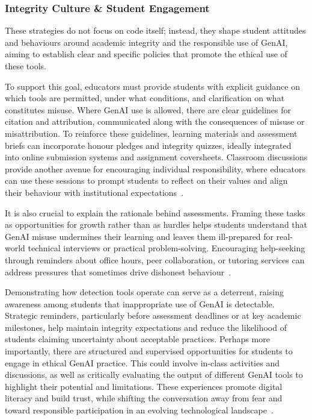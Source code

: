 \subsubsection{Integrity Culture \& Student Engagement}
\label{sec:integrity-culture-&-student-engagement}

These strategies do not focus on code itself; instead, they shape student attitudes and behaviours around academic integrity and the responsible use of GenAI, aiming to establish clear and specific policies that promote the ethical use of these tools. 

To support this goal, educators must provide students with explicit guidance on which tools are permitted, under what conditions, and clarification on what constitutes misuse. Where GenAI use is allowed, there are clear guidelines for citation and attribution, communicated along with the consequences of misuse or misattribution. To reinforce these guidelines, learning materials and assessment briefs can incorporate honour pledges and integrity quizzes, ideally integrated into online submission systems and assignment coversheets. Classroom discussions provide another avenue for encouraging individual responsibility, where educators can use these sessions to prompt students to reflect on their values and align their behaviour with institutional expectations~\cite{an_investigating_2025}. 

It is also crucial to explain the rationale behind assessments. Framing these tasks as opportunities for growth rather than as hurdles helps students understand that GenAI misuse undermines their learning and leaves them ill-prepared for real-world technical interviews or practical problem-solving. Encouraging help-seeking through reminders about office hours, peer collaboration, or tutoring services can address pressures that sometimes drive dishonest behaviour~\cite{balalle_reassessing_2025}.

Demonstrating how detection tools operate can serve as a deterrent, raising awareness among students that inappropriate use of GenAI is detectable. Strategic reminders, particularly before assessment deadlines or at key academic milestones, help maintain integrity expectations and reduce the likelihood of students claiming uncertainty about acceptable practices. Perhaps more importantly, there are structured and supervised opportunities for students to engage in ethical GenAI practice. This could involve in-class activities and discussions, as well as critically evaluating the output of different GenAI tools to highlight their potential and limitations. These experiences promote digital literacy and build trust, while shifting the conversation away from fear and toward responsible participation in an evolving technological landscape~\cite{king_artificial_2025}.

